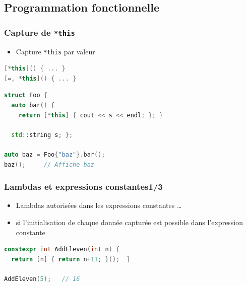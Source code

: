 \documentclass[C++.tex]{subfiles}
\begin{document}
\subsection*{Programmation fonctionnelle}
\begin{frame}[fragile]
	\frametitle{Capture de \lstinline|*this|}
	\begin{itemize}
		\item Capture \lstinline|*this| par valeur

	\end{itemize}

	\begin{lstlisting}[language=C++]
[*this]() { ... }
[=, *this]() { ... }\end{lstlisting}

	\begin{lstlisting}[language=C++]
struct Foo {
  auto bar() {
    return [*this] { cout << s << endl; }; }

  std::string s; };

auto baz = Foo{"baz"}.bar();
baz();     // Affiche baz\end{lstlisting}
\end{frame}

\begin{frame}[fragile]
	\frametitle{Lambdas et expressions constantes\titlehfill{}1/3}
	\begin{itemize}
		\item Lambdas autorisées dans les expressions constantes \ldots
		\item si l'initialisation de chaque donnée capturée est possible dans l'expression constante
	\end{itemize}

	\begin{lstlisting}[language=C++]
constexpr int AddEleven(int n) {
  return [n] { return n+11; }();  }

AddEleven(5);   // 16\end{lstlisting}
\end{frame}
\end{document}
